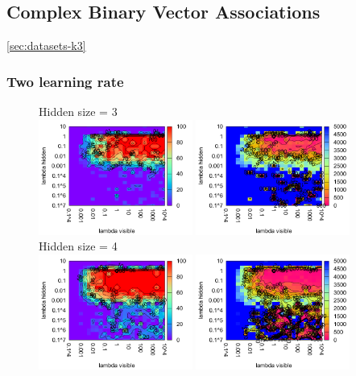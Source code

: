 
\subsection{Complex Binary Vector Associations} 

\ref{sec:datasets-k3} 


\subsubsection{Two learning rate} 
\label{sec:tlr-k3}

\begin{figure}[H]
  \centering
  Hidden size = 3 \\
  \includegraphics[width=0.45\textwidth]{img/k3/tlr-3-success.pdf} 
  \includegraphics[width=0.45\textwidth]{img/k3/tlr-3-epoch.pdf}   
  Hidden size = 4 \\
  \includegraphics[width=0.45\textwidth]{img/k3/tlr-4-success.pdf} 
  \includegraphics[width=0.45\textwidth]{img/k3/tlr-4-epoch.pdf}   

\end{figure}
